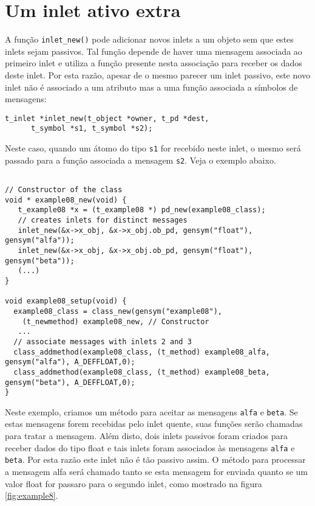 \section{Um inlet ativo extra}

A função \texttt{inlet\_new()} pode adicionar novos inlets a um objeto sem que 
estes inlets sejam passivos.
Tal função depende de haver uma mensagem associada ao primeiro inlet e utiliza
a função presente nesta associação para receber os dados deste inlet.
Por esta razão, apesar de o mesmo parecer um inlet passivo,
este novo inlet não é associado a um atributo mas a uma função associada a
símbolos de mensagens:

\begin{lstlisting}[caption=Criando inlets ativos extras]
t_inlet *inlet_new(t_object *owner, t_pd *dest,
      t_symbol *s1, t_symbol *s2);
\end{lstlisting}

Neste caso, quando um átomo do tipo \texttt{s1} for recebido neste inlet, o
mesmo será passado para a função associada a mensagem \texttt{s2}.
Veja o exemplo abaixo.

\begin{lstlisting}

// Constructor of the class
void * example08_new(void) {
   t_example08 *x = (t_example08 *) pd_new(example08_class);
   // creates inlets for distinct messages
   inlet_new(&x->x_obj, &x->x_obj.ob_pd, gensym("float"), gensym("alfa"));
   inlet_new(&x->x_obj, &x->x_obj.ob_pd, gensym("float"), gensym("beta"));
   (...)
}

void example08_setup(void) {
  example08_class = class_new(gensym("example08"),
    (t_newmethod) example08_new, // Constructor
   ...
  // associate messages with inlets 2 and 3
  class_addmethod(example08_class, (t_method) example08_alfa, gensym("alfa"), A_DEFFLOAT,0); 
  class_addmethod(example08_class, (t_method) example08_beta, gensym("beta"), A_DEFFLOAT,0); 
}
\end{lstlisting}

Neste exemplo, criamos um método para aceitar as mensagens \texttt{alfa} e \texttt{beta}.
Se estas mensagens forem recebidas pelo inlet quente, suas funções serão chamadas
para tratar a mensagem.
Além disto, dois inlets passivos foram criados para receber dados do tipo float
e tais inlets foram associados às mensagens \texttt{alfa} e \texttt{beta}.
Por esta razão este inlet não é tão passivo assim.
O método para processar a mensagem alfa será chamado tanto se esta
mensagem for enviada quanto se um valor float for passaro para o segundo inlet,
como mostrado na figura \ref{fig:example8}.

